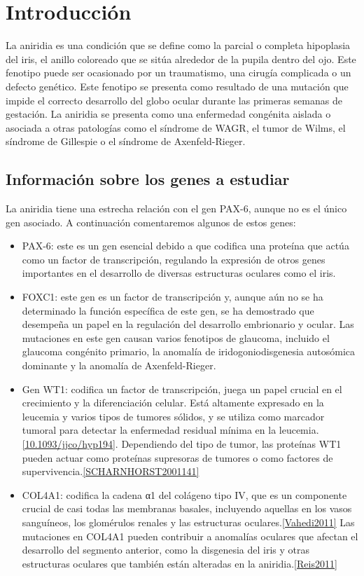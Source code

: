 \section{Introducción}


La aniridia es una condición que se define como la parcial o completa hipoplasia del iris, el anillo coloreado que se sitúa alrededor de la pupila dentro del ojo. Este fenotipo puede ser ocasionado por un traumatismo, una cirugía complicada o un defecto genético. 
Este fenotipo se presenta como resultado de una mutación que impide el correcto desarrollo del globo ocular durante las primeras semanas de gestación. La aniridia se presenta como una enfermedad congénita aislada o asociada a otras patologías como el síndrome de WAGR, el tumor de Wilms, el síndrome de Gillespie o el síndrome de Axenfeld-Rieger.

\subsection{Información sobre los genes a estudiar}

La aniridia tiene una estrecha relación con el gen PAX-6, aunque no es el único gen asociado. A continuación comentaremos algunos de estos genes: 

\begin{itemize}
	\item PAX-6: este es un gen esencial debido a que codifica una proteína que actúa como un factor de transcripción, regulando la expresión de otros genes importantes en el desarrollo de diversas estructuras oculares como el iris.
	\item FOXC1: este gen es un factor de transcripción y, aunque aún no se ha determinado la función específica de este gen, se ha demostrado que desempeña un papel en la regulación del desarrollo embrionario y ocular. Las mutaciones en este gen causan varios fenotipos de glaucoma, incluido el glaucoma congénito primario, la anomalía de iridogoniodisgenesia autosómica dominante y la anomalía de Axenfeld-Rieger.
	\item Gen WT1: codifica un factor de transcripción, juega un papel crucial en el crecimiento y la diferenciación celular. Está altamente expresado en la leucemia y varios tipos de tumores sólidos, y se utiliza como marcador tumoral para detectar la enfermedad residual mínima en la leucemia.\ref{10.1093/jjco/hyp194}. Dependiendo del tipo de tumor, las proteínas WT1 pueden actuar como proteínas supresoras de tumores o como factores de supervivencia.\ref{SCHARNHORST2001141}
	\item COL4A1: codifica la cadena α1 del colágeno tipo IV, que es un componente crucial de casi todas las membranas basales, incluyendo aquellas en los vasos sanguíneos, los glomérulos renales y las estructuras oculares.\ref{Vahedi2011} Las mutaciones en COL4A1 pueden contribuir a anomalías oculares que afectan el desarrollo del segmento anterior, como la disgenesia del iris y otras estructuras oculares que también están alteradas en la aniridia.\ref{Reis2011}	
	
\end{itemize}


